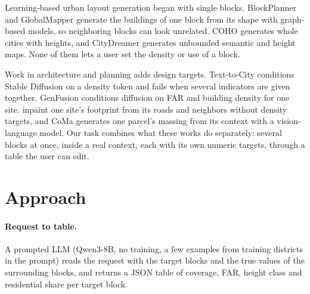 \documentclass[twocolumn,11pt]{article}
\begin{document}
Learning-based urban layout generation began with single blocks. BlockPlanner \citep{xu2021blockplanner} and GlobalMapper \citep{he2023globalmapper} generate the buildings of one block from its shape with graph-based models, so neighboring blocks can look unrelated. COHO \citep{he2024coho} generates whole cities with heights, and CityDreamer \citep{xie2024citydreamer} generates unbounded semantic and height maps. None of them lets a user set the density or use of a block.

Work in architecture and planning adds design targets. Text-to-City \citep{zhuang2024texttocity} conditions Stable Diffusion on a density token and fails when several indicators are given together. GenFusion \citep{gao2025genfusion} conditions diffusion on FAR and building density for one site. \citet{jang2026context} inpaint one site's footprint from its roads and neighbors without density targets, and CoMa \citep{maslov2026coma} generates one parcel's massing from its context with a vision-language model. Our task combines what these works do separately: several blocks at once, inside a real context, each with its own numeric targets, through a table the user can edit.


\section{Approach}
\paragraph{Request to table.} A prompted LLM (Qwen3-8B, no training, a few examples from training districts in the prompt) reads the request with the target blocks and the true values of the surrounding blocks, and returns a JSON table of coverage, FAR, height class and residential share per target block.
\end{document}

